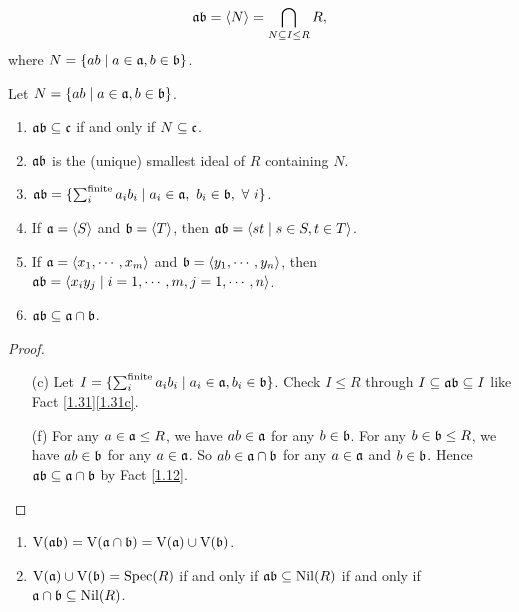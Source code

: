 \begin{definition}\label{1.37}
    \[\mathfrak{a} \mathfrak{b} = \langle N \rangle = \bigcap_{N \subseteq I \leq R}R,\] where $N = \{ab \mid a \in \mathfrak{a},b \in \mathfrak{b}\}$.
\end{definition}

\begin{fact}\label{1.38}
    Let $N = \{ab \mid a \in \mathfrak{a},b \in \mathfrak{b}\}$.
    \begin{enumerate}
        \item\label{1.38a} $\mathfrak{a} \mathfrak{b} \subseteq \mathfrak{c}$ if and only if $N \subseteq \mathfrak{c}$.
        \item\label{1.38b} $\mathfrak{a} \mathfrak{b}$ is the (unique) smallest ideal of $R$ containing $N$.
        \item\label{1.38c} $\mathfrak{a}\mathfrak{b} = \{\sum_{i}^{\text{finite}}a_ib_i \mid a_i \in \mathfrak{a},\ b_i \in \mathfrak{b}, \ \forall \  i\}$.
        \item\label{1.38d} If $\mathfrak{a} = \langle S \rangle$ and $\mathfrak{b} = \langle T \rangle$, then $\mathfrak{a}\mathfrak{b} = \langle st \mid s \in S, t \in T\rangle$.
        \item\label{1.38e} If $\mathfrak{a} = \langle x_1,\cdots,x_m \rangle$ and $\mathfrak{b} = \langle y_1,\cdots,y_n \rangle$, then $\mathfrak{a}\mathfrak{b} = \langle x_iy_j \mid i = 1,\cdots,m,j = 1,\cdots,n \rangle$.
        \item\label{1.38f} $\mathfrak{a} \mathfrak{b} \subseteq \mathfrak{a} \cap \mathfrak{b}$.
    \end{enumerate}
\end{fact}

\begin{proof}
    \begin{enumerate}
        \item [(c)]
            Let $I = \{\sum_{i}^{\text{finite}} a_ib_i \mid a_i \in \mathfrak{a},b_i \in \mathfrak{b}\}$. Check $I \leq R$ through $I \subseteq \mathfrak{a} \mathfrak{b} \subseteq I$ like Fact \ref{1.31}\ref{1.31c}.
        \item [(f)]
            For any $a \in \mathfrak{a} \leq R$, we have $ab \in \mathfrak{a}$ for any $b \in \mathfrak{b}$. For any $b \in \mathfrak{b} \leq R$, we have $ab \in \mathfrak{b}$ for any $a \in \mathfrak{a}$. So $ab \in \mathfrak{a} \cap \mathfrak{b}$ for any $a \in \mathfrak{a}$ and $b \in \mathfrak{b}$. Hence $\mathfrak{a} \mathfrak{b} \subseteq \mathfrak{a} \cap \mathfrak{b}$ by Fact \ref{1.12}. \qedhere
    \end{enumerate}
\end{proof}

\begin{proposition}\label{1.39}
    \begin{enumerate}
        \item\label{1.39a} 
            $\operatorname{V}(\mathfrak{a} \mathfrak{b}) = \operatorname{V}(\mathfrak{a} \cap \mathfrak{b}) = \operatorname{V}(\mathfrak{a}) \cup \operatorname{V}(\mathfrak{b})$.
        \item\label{1.39b} 
            $\operatorname{V}(\mathfrak{a}) \cup \operatorname{V}(\mathfrak{b}) = \operatorname{Spec}(R)$ if and only if $\mathfrak{a} \mathfrak{b} \subseteq \operatorname{Nil}(R)$ if and only if $\mathfrak{a} \cap \mathfrak{b} \subseteq \operatorname{Nil}(R)$.
    \end{enumerate}
\end{proposition}

